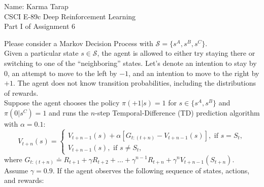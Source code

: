 \documentclass[12pt]{letter}
\begin{document}
\begin{flushleft}
{\sc Name: Karma Tarap}\\
CSCI E-89c Deep Reinforcement Learning\\
Part I of Assignment 6\\
\end{flushleft}

Please consider a Markov Decision Process with  $\mathcal{S}=\{s^{A},s^{B},s^{C}\}$.\medskip\\
Given a particular state $s\in \mathcal{S}$, the agent is allowed to either try staying there or switching to one of the ``neighboring'' states. Let's denote an intention to stay by $0$, an attempt to move to the left by $-1$, and an intention to move to the right by $+1$. The agent does not know transition probabilities, including the distributions of rewards.\medskip\\
Suppose the agent chooses the policy $\pi(+1|s)=1$ for $s\in\{s^A,s^B\}$ and $\pi(0|s^C)=1$ and runs the $n$-step Temporal-Difference (TD) prediction algorithm with $\alpha=0.1$:
$$V_{t+n}(s)=\begin{cases}
V_{t+n-1}(s)+\alpha\left[G_{t:(t+n)}-V_{t+n-1}(s)\right], \text{ if } s=S_t,\\
V_{t+n-1}(s), \text{ if } s\neq S_t,
\end{cases}$$
where $G_{t:(t+n)}\doteq R_{t+1}+\gamma R_{t+2}+\ldots+\gamma^{n-1}R_{t+n}+\gamma^n V_{t+n-1}(S_{t+n}).$\medskip\\
Assume $\gamma=0.9$. If the agent observes the following sequence of states, actions, and rewards:\medskip\\
\end{document}
